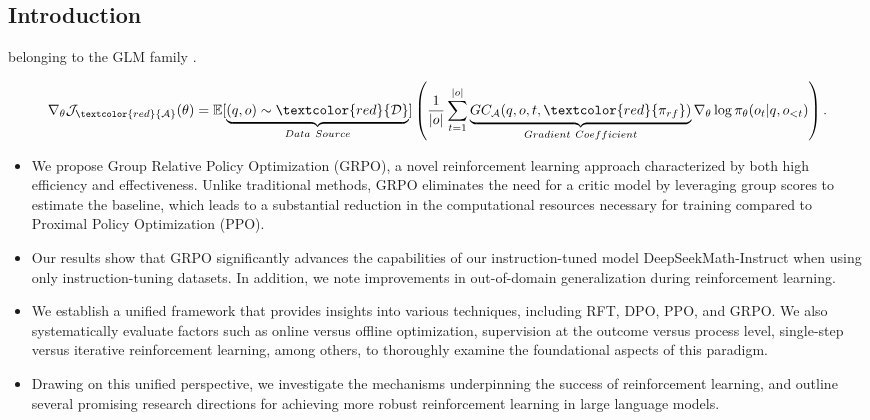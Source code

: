 \begin{itemize}[topsep=0pt]
\begin{itemize}[topsep=0pt]
\section{Introduction}

    belonging to the GLM family \citep{glm}.
\end{itemize}

\begin{equation}
    \nabla_{\theta}\mathcal{J}_{\textcolor{red}{\mathcal{A}}}(\theta) = \mathbb{E}[\underbrace{(q,o) \sim \textcolor{red}{\mathcal{D}}}_{Data \ Source}]\left( \frac{1}{|o|} \sum_{t=1}^{|o|}  \underbrace{GC_{{\mathcal{A}}}(q, o, t, \textcolor{red}{\pi_{{rf}}})}_{Gradient \ Coefficient}  \nabla_{\theta}\log \pi_{\theta}(o_t | q, o_{<t})\right).
\label{eq:objective}
\end{equation}

\begin{itemize}[topsep=0pt]
    \item We propose Group Relative Policy Optimization (GRPO), a novel reinforcement learning approach characterized by both high efficiency and effectiveness. Unlike traditional methods, GRPO eliminates the need for a critic model by leveraging group scores to estimate the baseline, which leads to a substantial reduction in the computational resources necessary for training compared to Proximal Policy Optimization (PPO).
    \item Our results show that GRPO significantly advances the capabilities of our instruction-tuned model DeepSeekMath-Instruct when using only instruction-tuning datasets. In addition, we note improvements in out-of-domain generalization during reinforcement learning.
    \item We establish a unified framework that provides insights into various techniques, including RFT, DPO, PPO, and GRPO. We also systematically evaluate factors such as online versus offline optimization, supervision at the outcome versus process level, single-step versus iterative reinforcement learning, among others, to thoroughly examine the foundational aspects of this paradigm.
    \item Drawing on this unified perspective, we investigate the mechanisms underpinning the success of reinforcement learning, and outline several promising research directions for achieving more robust reinforcement learning in large language models.
\end{itemize}


\end{itemize}
